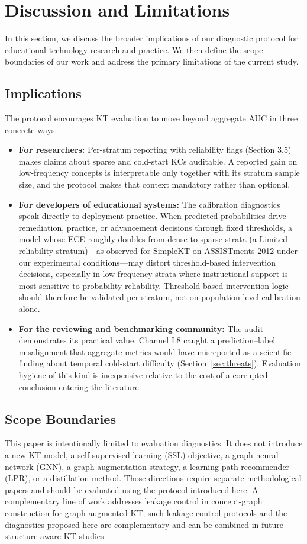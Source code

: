 \section{Discussion and Limitations}
\label{sec:discussion}
In this section, we discuss the broader implications of our diagnostic protocol for educational technology research and practice. We then define the scope boundaries of our work and address the primary limitations of the current study.

\subsection{Implications}
The protocol encourages KT evaluation to move beyond aggregate AUC in three concrete ways:
\begin{itemize}
    \item \textbf{For researchers:} Per-stratum reporting with reliability flags (Section 3.5) makes claims about sparse and cold-start KCs auditable. A reported gain on low-frequency concepts is interpretable only together with its stratum sample size, and the protocol makes that context mandatory rather than optional.
    \item \textbf{For developers of educational systems:} The calibration diagnostics speak directly to deployment practice. When predicted probabilities drive remediation, practice, or advancement decisions through fixed thresholds, a model whose ECE roughly doubles from dense to sparse strata (a Limited-reliability stratum)---as observed for SimpleKT on ASSISTments 2012 under our experimental conditions---may distort threshold-based intervention decisions, especially in low-frequency strata where instructional support is most sensitive to probability reliability. Threshold-based intervention logic should therefore be validated per stratum, not on population-level calibration alone.
    \item \textbf{For the reviewing and benchmarking community:} The audit demonstrates its practical value. Channel L8 caught a prediction--label misalignment that aggregate metrics would have misreported as a scientific finding about temporal cold-start difficulty (Section~\ref{sec:threats}). Evaluation hygiene of this kind is inexpensive relative to the cost of a corrupted conclusion entering the literature.
\end{itemize}

\subsection{Scope Boundaries}
This paper is intentionally limited to evaluation diagnostics. It does not introduce a new KT model, a self-supervised learning (SSL) objective, a graph neural network (GNN), a graph augmentation strategy, a learning path recommender (LPR), or a distillation method. Those directions require separate methodological papers and should be evaluated using the protocol introduced here. A complementary line of work addresses leakage control in concept-graph construction for graph-augmented KT; such leakage-control protocols and the diagnostics proposed here are complementary and can be combined in future structure-aware KT studies.

